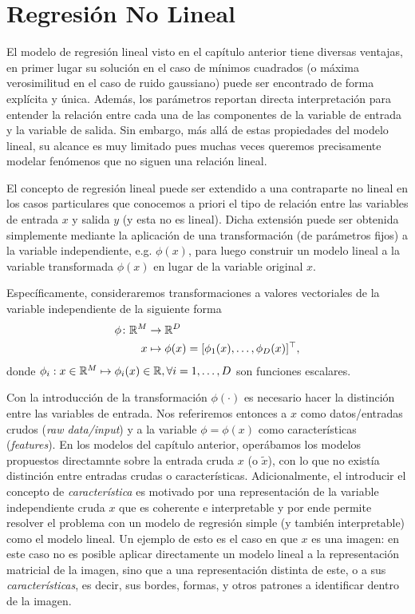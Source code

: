 
\section{Regresión No Lineal}

El modelo de regresión lineal visto en el capítulo anterior tiene diversas ventajas, en primer lugar su solución en el caso de mínimos cuadrados (o máxima verosimilitud en el caso de ruido gaussiano) puede ser encontrado de forma explícita y única. Además, los parámetros reportan  directa interpretación para entender la relación entre cada una de las componentes de la variable de entrada y la variable de salida. Sin embargo, más allá de estas propiedades del modelo lineal, su alcance es muy limitado pues muchas veces queremos precisamente modelar fenómenos que no siguen una relación lineal. 

El concepto de regresión lineal puede ser extendido a una contraparte no lineal en los casos particulares que conocemos a priori el tipo de relación entre las variables de entrada $x$ y salida $y$ (y esta  no es lineal). Dicha extensión puede ser obtenida simplemente mediante la aplicación de una transformación (de parámetros fijos) a la variable independiente, e.g. $\phi(x)$, para luego construir un modelo lineal a la variable transformada $\phi(x)$ en lugar de la variable original $x$. 

Específicamente, consideraremos transformaciones a valores vectoriales de la variable independiente de la siguiente forma
\begin{align}
  \phi \colon {\mathbb R}^M &\to {\mathbb R}^D \nonumber\\
  x &\mapsto \phi(x)=[\phi_1(x),\ldots,\phi_D(x)]^\top,
\end{align}
donde $\phi_i: x\in{\mathbb R}^M \mapsto \phi_i(x)\in{\mathbb R}, \forall i=1,\ldots,D$ son funciones escalares. 

Con la introducción de la transformación $\phi(\cdot)$ es necesario hacer la distinción entre las variables de entrada. Nos referiremos entonces a $x$ como datos/entradas crudos (\emph{raw data/input}) y a la variable  $\phi=\phi(x)$ como  características (\emph{features}). En los modelos del capítulo anterior, operábamos los modelos propuestos directamnte sobre la entrada cruda $x$ (o $\tilde{x}$), con lo que no existía distinción entre entradas crudas o características. Adicionalmente, el introducir el concepto de \emph{característica} es motivado por una representación de la variable independiente cruda $x$ que es coherente e interpretable y por ende permite resolver el problema con un modelo de regresión simple (y también interpretable) como el modelo lineal. Un ejemplo de esto es el caso en que $x$ es una imagen: en este caso no es posible aplicar directamente un modelo lineal a la representación matricial de la imagen, sino que a una representación distinta de este, o a sus \emph{características}, es decir, sus bordes, formas, y otros patrones a identificar dentro de la imagen. 

